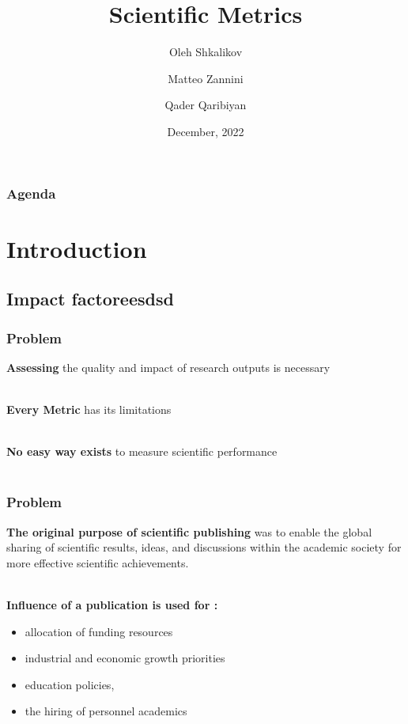 \documentclass{beamer}
\title[Scientific metrics]{Scientific Metrics}
\author[O. Shkalikov \and M. Zannini \and Q.Qaribiyan]
{Oleh Shkalikov \and Matteo Zannini \and Qader Qaribiyan}
\institute[]{TU Dresden, Computer Science Faculty}
\date{December, 2022}
\begin{document}
\frame{\titlepage}

\begin{frame}
    \frametitle{Agenda}
    \tableofcontents
\end{frame}

\section{Introduction}

\subsection{Impact factoreesdsd}
\begin{frame}

    \frametitle{Problem}

    \textbf{Assessing} the quality and impact of research outputs is necessary \\~\

    \textbf{Every Metric} has its limitations\\~\

    \textbf{No easy way exists} to measure scientific performance\\~\

\end{frame}
\begin{frame}

    \frametitle{Problem}

    \textbf{The original purpose of scientific publishing} was to enable the global sharing of scientific results, ideas, and discussions within the academic society for more effective scientific achievements.\\~\

    \textbf{Influence of a publication is used for :}

    \begin{itemize}
        \item allocation of funding resources
        \item industrial and economic growth priorities
        \item  education policies,
        \item  the hiring of personnel academics
    \end{itemize}

\end{frame}
\end{document}
